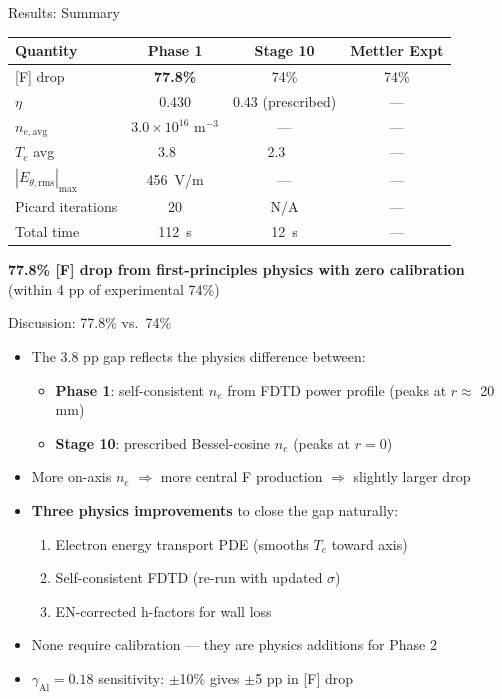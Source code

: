 \documentclass[aspectratio=169,10pt]{beamer}
\newcommand{\Te}{T_e}
\newcommand{\eV}{\,\mathrm{eV}}
\begin{document}
\begin{frame}{Results: Summary}
  \centering
  \footnotesize
  \begin{tabular}{@{}lccc@{}}
    \toprule
    \textbf{Quantity} & \textbf{Phase 1} & \textbf{Stage 10} & \textbf{Mettler Expt} \\
    \midrule
    {[F] drop}         & \textbf{77.8\%}  & 74\%              & 74\% \\
    $\eta$             & 0.430            & 0.43 (prescribed) & --- \\
    $n_{e,\text{avg}}$ & $3.0\times10^{16}$ m$^{-3}$ & --- & --- \\
    $\Te$ avg          & \SI{3.8}{\eV}    & \SI{2.3}{\eV}     & --- \\
    $|E_{\theta,\text{rms}}|_\text{max}$ & \SI{456}{\volt/\meter} & --- & --- \\
    Picard iterations  & 20               & N/A               & --- \\
    Total time         & \SI{112}{\second} & \SI{12}{\second}  & --- \\
    \bottomrule
  \end{tabular}

  \vspace{0.4cm}
  \normalsize
  \textbf{77.8\% [F] drop from first-principles physics with zero calibration}\\
  (within 4 pp of experimental 74\%)
\end{frame}

\begin{frame}{Discussion: 77.8\% vs.\ 74\%}
  \begin{itemize}[]
    \item The 3.8 pp gap reflects the physics difference between:
    \begin{itemize}[]
      \item \textbf{Phase 1}: self-consistent $n_e$ from FDTD power profile (peaks at $r\approx$ 20 mm)
      \item \textbf{Stage 10}: prescribed Bessel-cosine $n_e$ (peaks at $r = 0$)
    \end{itemize}
    \item More on-axis $n_e$ $\Rightarrow$ more central F production $\Rightarrow$ slightly larger drop
    \item \textbf{Three physics improvements} to close the gap naturally:
    \begin{enumerate}[]
      \item Electron energy transport PDE (smooths $\Te$ toward axis)
      \item Self-consistent FDTD (re-run with updated $\sigma$)
      \item EN-corrected h-factors for wall loss
    \end{enumerate}
    \item None require calibration --- they are physics additions for Phase 2
    \item $\gamma_\text{Al} = 0.18$ sensitivity: $\pm$10\% gives $\pm$5 pp in [F] drop
  \end{itemize}
\end{frame}
\end{document}
